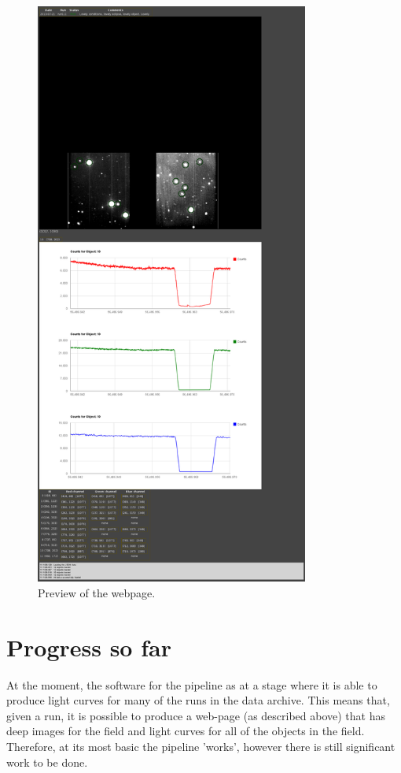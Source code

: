 \documentclass[a4paper,10pt]{article}
\begin{document}
\begin{figure}[!h]
	\centering
	\includegraphics[width=90mm]{images/browser.png}
	\caption{Preview of the webpage.}
	\label{browser}
\end{figure}

\section{Progress so far}
At the moment, the software for the pipeline as at a stage where it is able to produce light curves for many of the runs in the data archive. This means that, given a run, it is possible to produce a web-page (as described above) that has deep images for the field and light curves for all of the objects in the field. Therefore, at its most basic the pipeline 'works', however there is still significant work to be done. 
\end{document}
